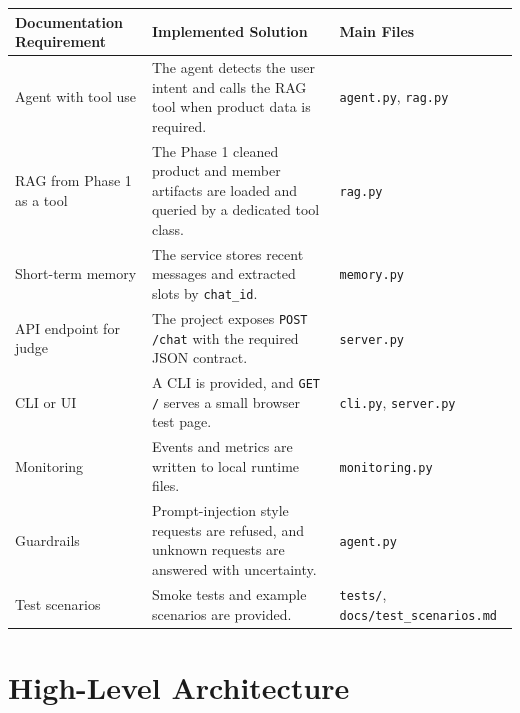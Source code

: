 \documentclass[12pt,a4paper]{article}
\begin{document}
\begin{longtable}{|p{}|p{}|p{}|}
\hline
\textbf{Documentation Requirement} & \textbf{Implemented Solution} & \textbf{Main Files} \\
\hline
Agent with tool use & The agent detects the user intent and calls the RAG tool when product data is required. & \texttt{agent.py}, \texttt{rag.py} \\
\hline
RAG from Phase 1 as a tool & The Phase 1 cleaned product and member artifacts are loaded and queried by a dedicated tool class. & \texttt{rag.py} \\
\hline
Short-term memory & The service stores recent messages and extracted slots by \texttt{chat\_id}. & \texttt{memory.py} \\
\hline
API endpoint for judge & The project exposes \texttt{POST /chat} with the required JSON contract. & \texttt{server.py} \\
\hline
CLI or UI & A CLI is provided, and \texttt{GET /} serves a small browser test page. & \texttt{cli.py}, \texttt{server.py} \\
\hline
Monitoring & Events and metrics are written to local runtime files. & \texttt{monitoring.py} \\
\hline
Guardrails & Prompt-injection style requests are refused, and unknown requests are answered with uncertainty. & \texttt{agent.py} \\
\hline
Test scenarios & Smoke tests and example scenarios are provided. & \texttt{tests/}, \texttt{docs/test\_scenarios.md} \\
\hline
\end{longtable}

\section{High-Level Architecture}
\end{document}
